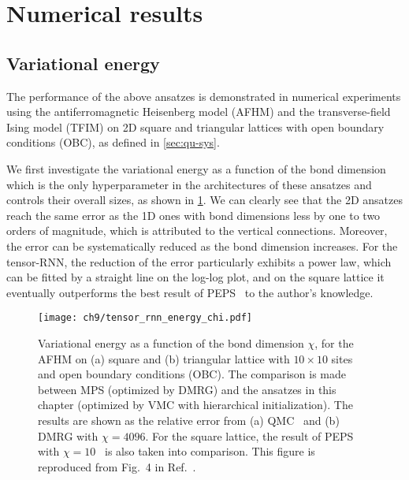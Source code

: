 \section{Numerical results}

\subsection{Variational energy}

The performance of the above ansatzes is demonstrated in numerical experiments using the antiferromagnetic Heisenberg model (AFHM) and the transverse-field Ising model (TFIM) on 2D square and triangular lattices with open boundary conditions (OBC), as defined in \cref{sec:qu-sys}.

We first investigate the variational energy as a function of the bond dimension which is the only hyperparameter in the architectures of these ansatzes and controls their overall sizes, as shown in \cref{fig:tensor-rnn-energy-chi}. We can clearly see that the 2D ansatzes reach the same error as the 1D ones with bond dimensions less by one to two orders of magnitude, which is attributed to the vertical connections. Moreover, the error can be systematically reduced as the bond dimension increases. For the tensor-RNN, the reduction of the error particularly exhibits a power law, which can be fitted by a straight line on the log-log plot, and on the square lattice it eventually outperforms the best result of PEPS~\cite{liu2017gradient} to the author's knowledge.

\begin{figure}[htb]
\centering
\hspace*{-0.05\linewidth}
\texttt{[image: ch9/tensor\_rnn\_energy\_chi.pdf]}
\caption[Variational energy vs. bond dimension for tensor-RNN]{
Variational energy as a function of the bond dimension $\chi$, for the AFHM on (a) square and (b) triangular lattice with $10 \times 10$ sites and open boundary conditions (OBC). The comparison is made between MPS (optimized by DMRG) and the ansatzes in this chapter (optimized by VMC with hierarchical initialization). The results are shown as the relative error from (a) QMC~\cite{sandvik1997finite} and (b) DMRG with $\chi = 4096$. For the square lattice, the result of PEPS with $\chi = 10$~\cite{liu2017gradient} is also taken into comparison.
This figure is reproduced from Fig.~4 in Ref.~\cite{wu2023tensor}.
}
\label{fig:tensor-rnn-energy-chi}
\end{figure}

